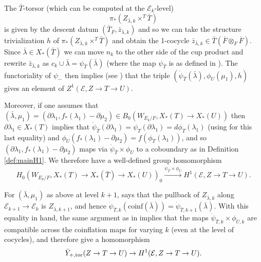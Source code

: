 \documentclass{amsart}
\theoremstyle{definition}
\theoremstyle{remark}
\newcommand{\ov}{\overline}
\begin{document}
The $\bar{T}$-torsor (which can be computed at the $\mathcal{E}_{k}$-level)
\begin{equation*}
\pi_{*}(Z_{\bar{\lambda},k} \times^{T} \bar{T})
\end{equation*}
is given by the descent datum $(\bar{T}_{\ov{F}}, \bar{z}_{\bar{\lambda},k})$ and so we can take the structure trivialization $h$ of $\pi_{*}(Z_{\bar{\lambda},k} \times^{T} \bar{T})$ and obtain the 1-cocycle $\bar{z}_{\bar{\lambda},k} \in \bar{T}(\ov{F} \otimes_{F} \ov{F})$. Since $\bar{\lambda} \in X_{*}(\bar{T})$ we can move $n_{k}$ to the other side of the cup product and rewrite $\bar{z}_{\bar{\lambda},k}$ as $c_{k} \cup \bar{\lambda} = \psi_{\bar{T}}(\bar{\lambda})$ (where the map $\psi_{\bar{T}}$ is as defined in \cite[\S A.3]{KS99}). The functoriality of $\psi_{-}$ then implies (see \cite[\S 5.2]{Kal26b}) that the triple $(\dot{\psi}_{\bar{T}}(\bar{\lambda}), \phi_{U}(\mu_{1}),h)$ gives an element of $Z^{1}(\mathcal{E},Z \to T \to U)$.

Moreover, if one assumes that $(\bar{\lambda},\mu_{1}) = (\partial\lambda_{1}, f_{*}(\lambda_{1}) - \partial\mu_{2}) \in B_{0}(W_{E_{k}/F}, X_{*}(T) \to X_{*}(U))$ then $\partial \lambda_{1} \in X_{*}(T)$ implies that $\dot{\psi}_{\bar{T}}(\partial \lambda_{1}) = \psi_{T}(\partial \lambda_{1}) = d \phi_{T}(\lambda_{1})$ (using \cite[\S A.3]{KS99} for this last equality) and $\phi_{U}(f_{*}(\lambda_{1})-\partial \mu_{2}) = f(\phi_{T}(\lambda_{1}))$, and so $(\partial\lambda_{1}, f_{*}(\lambda_{1})-\partial\mu_{2})$ maps via $\dot{\psi}_{\bar{T}} \times \phi_{U}$ to a coboundary as in Definition \ref{def:mainH1}. We therefore have a well-defined group homomorphism
\begin{equation*}
    H_{0}(W_{E_{k}/F}, X_{*}(T) \to X_{*}(\bar{T}) \to X_{*}(U))_{0} \xrightarrow{\dot{\psi}_{\bar{T}} \times \phi_{U}} H^{1}(\mathcal{E},Z \to T \to U).
\end{equation*}

For $(\bar{\lambda},\mu_{1})$ as above at level $k+1$, \cite[Lemma 4.9]{Dillery1} says that the pullback of $Z_{\bar{\lambda},k}$ along $\mathcal{E}_{k+1} \to \mathcal{E}_{k}$ is $Z_{\bar{\lambda},k+1}$, and hence $\dot{\psi}_{\bar{T},k}(\text{coinf}(\bar{\lambda})) = \dot{\psi}_{\bar{T},k+1}(\bar{\lambda})$. With this equality in hand, the same argument as in \cite[\S 5.2, before (5.5)]{Kal26b} implies that the maps $\dot{\psi}_{\bar{T},k} \times \phi_{U,k}$ are compatible across the coinflation maps for varying $k$ (even at the level of cocycles), and therefore give a homomorphism
\begin{equation}\label{eq:TNmap}
    \bar{Y}_{+,\textnormal{tor}}(Z \to T \to U) \to H^{1}(\mathcal{E},Z \to T \to U).
\end{equation}
\end{document}
